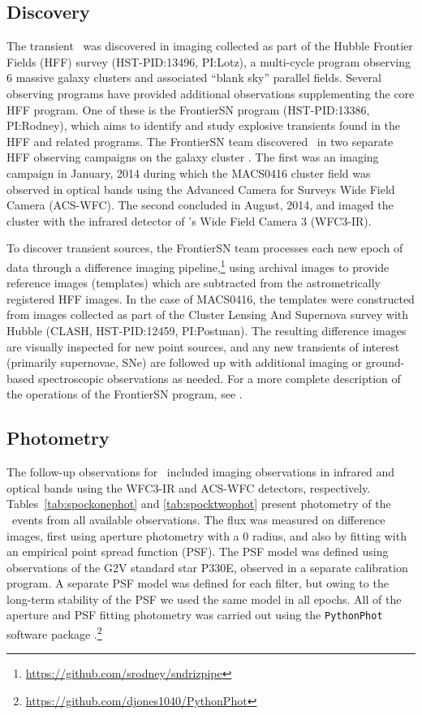 \subsection{Discovery}\label{sec:Discovery}

The transient \spock\ was discovered in \HST imaging collected as part
of the Hubble Frontier Fields (HFF) survey (HST-PID:13496, PI:Lotz), a
multi-cycle program observing 6 massive galaxy clusters and associated
``blank sky'' parallel fields.  Several \HST observing programs have
provided additional observations supplementing the core HFF program.
One of these is the FrontierSN program (HST-PID:13386, PI:Rodney),
which aims to identify and study explosive transients found in the HFF
and related programs.  The FrontierSN team discovered \spock\ in two
separate HFF observing campaigns on the galaxy cluster
.  The first was an imaging campaign
in January, 2014 during which the MACS0416 cluster field was observed
in optical bands using the Advanced Camera for Surveys Wide Field
Camera (ACS-WFC).  The second concluded in August, 2014, and imaged
the cluster with the infrared detector of \HST's Wide Field Camera 3
(WFC3-IR).

To discover transient sources, the FrontierSN team processes each new
epoch of \HST data through a difference imaging
pipeline,\footnote{\url{https://github.com/srodney/sndrizpipe}} using
archival \HST images to provide reference images (templates) which are
subtracted from the astrometrically registered HFF images. In the case
of MACS0416, the templates were constructed from images collected as
part of the Cluster Lensing And Supernova survey with Hubble (CLASH,
HST-PID:12459, PI:Postman). The resulting difference images are
visually inspected for new point sources, and any new transients of
interest (primarily supernovae, SNe) are followed up with additional
\HST imaging or ground-based spectroscopic observations as needed.  For
a more complete description of the operations of the FrontierSN
program, see \citet{Rodney:2015a}.


\subsection{Photometry}\label{sec:Photometry}

The follow-up observations for \spock\ included \HST imaging
observations in infrared and optical bands using the WFC3-IR and
ACS-WFC detectors, respectively. Tables~\ref{tab:spockonephot} and
\ref{tab:spocktwophot} present photometry of the \spock\ events from
all available \HST observations. The flux was measured on difference
images, first using aperture photometry with a 0 radius, and
also by fitting with an empirical point spread function (PSF).  The
PSF model was defined using \HST observations of the G2V standard star
P330E, observed in a separate calibration program.  A separate PSF
model was defined for each filter, but owing to the long-term
stability of the \HST PSF we used the same model in all epochs.  All
of the aperture and PSF fitting photometry was carried out using the
{\tt PythonPhot} software package
\citep{Jones:2015}.\footnote{\url{https://github.com/djones1040/PythonPhot}}


